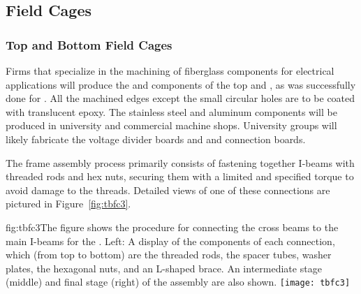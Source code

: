 \subsection{Field Cages}
\label{sec:fdsp-hv-prod-fc}


\subsubsection{Top and Bottom Field Cages}

Firms that specialize in the machining of fiberglass components for electrical applications will produce the  and \frfour components of the top and , as was successfully done for . 
All the machined edges except the small circular holes are to be coated with translucent epoxy. The stainless steel and aluminum components will be produced in university and commercial machine shops. University groups will likely fabricate the voltage divider boards and  and  connection boards.

The  frame assembly process primarily consists of fastening together  I-beams with  threaded rods and hex nuts,  securing them with a limited and specified torque to avoid damage to the threads. Detailed views of one of these connections are pictured in Figure~\ref{fig:tbfc3}.

\begin{dunefigure}{fig:tbfc3}{The figure shows the procedure for connecting the cross beams to the main I-beams for the . Left: A display of the components of each connection, which (from top to bottom) are the threaded rods, the spacer tubes, washer plates, the hexagonal nuts, and an L-shaped  brace. An intermediate stage (middle) and final stage (right) of the assembly are also shown.}
\texttt{[image: tbfc3]}
\end{dunefigure}

